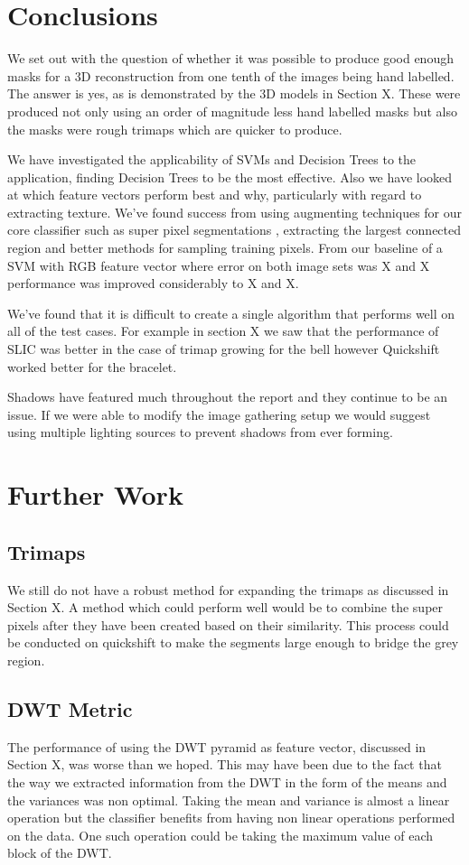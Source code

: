 \documentclass[12pt]{IIBproject}
\begin{document}
\section{Conclusions}
We set out with the question of whether it was possible to produce good enough masks for a 3D reconstruction from one tenth of the images being hand labelled. The answer is yes, as is demonstrated by the 3D models in Section X. These were produced not only using an order of magnitude less hand labelled masks but also the masks were rough trimaps which are quicker to produce.

We have investigated the applicability of SVMs and Decision Trees to the application, finding Decision Trees to be the most effective. Also we have looked at which feature vectors perform best and why, particularly with regard to extracting texture. We've found success from using augmenting techniques for our core classifier such as super pixel segmentations , extracting the largest connected region and better methods for sampling training pixels. From our baseline of a SVM with RGB feature vector where error on both image sets was X and X performance was improved considerably to X and X. 

We've found that it is difficult to create a single algorithm that performs well on all of the test cases. For example in section X we saw that the performance of SLIC was better in the case of trimap growing for the bell however Quickshift worked better for the bracelet. 

Shadows have featured much throughout the report and they continue to be an issue. If we were able to modify the image gathering setup we would suggest using multiple lighting sources to prevent shadows from ever forming.


\section{Further Work}
\subsection{Trimaps}
We still do not have a robust method for expanding the trimaps as discussed in Section X. A method which could perform well would be to combine the super pixels after they have been created based on their similarity\cite{shih2005automatic}. This process could be conducted on quickshift to make the segments large enough to bridge the grey region.
\subsection{DWT Metric}
The performance of using the DWT pyramid as feature vector, discussed in Section X, was worse than we hoped. This may have been due to the fact that the way we extracted information from the DWT in the form of the means and the variances was non optimal. Taking the mean and variance is almost a linear operation but the classifier benefits from having non linear operations performed on the data. One such operation could be taking the maximum value of each block of the DWT. 
\end{document}
